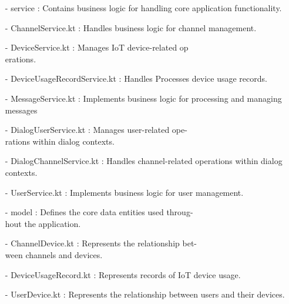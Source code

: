 \documentclass[conference]{IEEEtran}
\begin{document}
\begin{enumerate}
        \item[-] service : Contains business logic for handling core application functionality.\\
        
        \item[-] ChannelService.kt : Handles business logic for channel management. \\
        
        \item[-] DeviceService.kt : Manages IoT device-related op\\erations.\\
        
        \item[-] DeviceUsageRecordService.kt : Handles Processes device usage records.\\
        
        \item[-] MessageService.kt : Implements business logic for processing and managing messages\\
        
        \item[-] DialogUserService.kt : Manages user-related ope-\\rations within dialog contexts.
\\
        \item[-] DialogChannelService.kt : Handles channel-related operations within dialog contexts.\\
        
        \item[-] UserService.kt : Implements business logic for user management.\\
        
        \item[-] model : Defines the core data entities used throug-\\hout the application.\\
        \item[-] ChannelDevice.kt : Represents the relationship bet-\\ween channels and devices.\\
        \item[-] DeviceUsageRecord.kt : Represents records of IoT device usage.\\
        \item[-] UserDevice.kt : Represents the relationship between users and their devices.\\


\end{enumerate}
\end{document}
